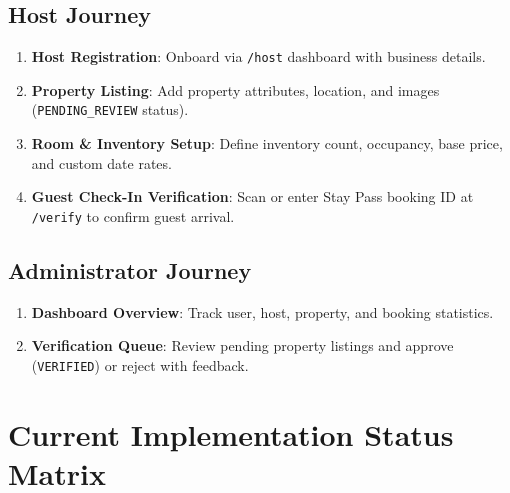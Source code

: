 \documentclass[11pt,a4paper]{article}
\begin{document}
\subsection{Host Journey}
\begin{enumerate}
    \item \textbf{Host Registration}: Onboard via \texttt{/host} dashboard with business details.
    \item \textbf{Property Listing}: Add property attributes, location, and images (\texttt{PENDING\_REVIEW} status).
    \item \textbf{Room \& Inventory Setup}: Define inventory count, occupancy, base price, and custom date rates.
    \item \textbf{Guest Check-In Verification}: Scan or enter Stay Pass booking ID at \texttt{/verify} to confirm guest arrival.
\end{enumerate}

\subsection{Administrator Journey}
\begin{enumerate}
    \item \textbf{Dashboard Overview}: Track user, host, property, and booking statistics.
    \item \textbf{Verification Queue}: Review pending property listings and approve (\texttt{VERIFIED}) or reject with feedback.
\end{enumerate}

\section{Current Implementation Status Matrix}
\end{document}
